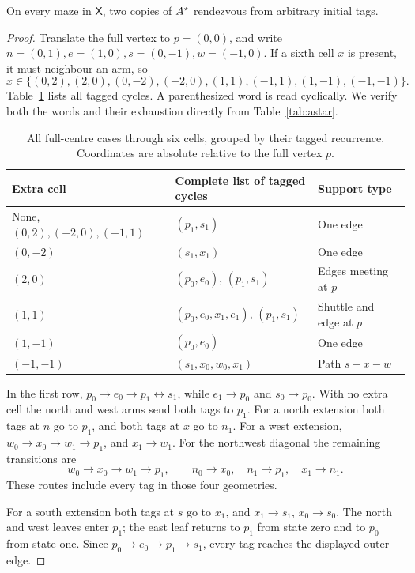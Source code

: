 

\begin{lemma}\label{c:full-centre}
On every maze in \(\mathsf X\), two copies of \(A^{\star}\) rendezvous from
arbitrary initial tags.
\end{lemma}
\begin{proof}
Translate the full vertex to \(p=(0,0)\), and write
\(n=(0,1),e=(1,0),s=(0,-1),w=(-1,0)\). If a sixth cell \(x\) is present,
it must neighbour an arm, so
\[
x\in\{(0,2),(2,0),(0,-2),(-2,0),(1,1),(-1,1),(1,-1),(-1,-1)\}.
\]
Table~\ref{c:cross-cycles} lists all tagged cycles. A parenthesized word is
read cyclically. We verify both the words and their exhaustion directly from
Table~\ref{tab:astar}.

\begin{table}[!htbp]
\centering\small
\begin{tabular}{lll}
\toprule
Extra cell & Complete list of tagged cycles & Support type \\
\midrule
None, \((0,2),(-2,0),(-1,1)\) & \((p_1,s_1)\) & One edge \\
\((0,-2)\) & \((s_1,x_1)\) & One edge \\
\((2,0)\) & \((p_0,e_0)\), \((p_1,s_1)\) & Edges meeting at \(p\) \\
\((1,1)\) & \((p_0,e_0,x_1,e_1)\), \((p_1,s_1)\) & Shuttle and edge at \(p\) \\
\((1,-1)\) & \((p_0,e_0)\) & One edge \\
\((-1,-1)\) & \((s_1,x_0,w_0,x_1)\) & Path \(s-x-w\) \\
\bottomrule
\end{tabular}
\caption{All full-centre cases through six cells, grouped by their tagged
recurrence. Coordinates are absolute relative to the full vertex \(p\).}
\label{c:cross-cycles}
\end{table}

In the first row, \(p_0\to e_0\to p_1\leftrightarrow s_1\), while
\(e_1\to p_0\) and \(s_0\to p_0\). With no extra cell the north and west
arms send both tags to \(p_1\). For a north extension both tags at \(n\)
go to \(p_1\), and both tags at \(x\) go to \(n_1\). For a west extension,
\(w_0\to x_0\to w_1\to p_1\), and \(x_1\to w_1\). For the northwest
diagonal the remaining transitions are
\[
w_0\to x_0\to w_1\to p_1,\qquad
n_0\to x_0,\quad n_1\to p_1,\quad x_1\to n_1.
\]
These routes include every tag in those four geometries.

For a south extension both tags at \(s\) go to \(x_1\), and
\(x_1\to s_1\), \(x_0\to s_0\). The north and west leaves enter
\(p_1\); the east leaf returns to \(p_1\) from state zero and to \(p_0\)
from state one. Since \(p_0\to e_0\to p_1\to s_1\), every tag reaches
the displayed outer edge.


\end{proof}

